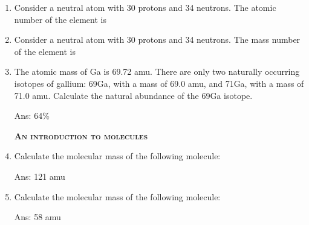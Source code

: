 \documentclass[main.tex]{subfiles}
\begin{document}
\begin{multicols*}{2}
\begin{enumerate}
\item Consider a neutral atom with 30 protons and 34 neutrons. The atomic number of the element is
\begin{enumerate}[label=(\alph*)]
\end{enumerate}

\item Consider a neutral atom with 30 protons and 34 neutrons. The mass number of the element is
\begin{enumerate}[label=(\alph*)]
\end{enumerate}

\item The atomic mass of Ga is 69.72 amu. There are only two naturally occurring isotopes of gallium: 69Ga, with a mass of 69.0 amu, and 71Ga, with a mass of 71.0 amu. Calculate the natural abundance of the 69Ga isotope. 
\begin{flushright}\small Ans: 64\% \end{flushright}



{\raggedright\textsc{\textbf{An introduction to molecules }}\par}

\item Calculate the molecular mass of the following molecule: 
\begin{flushright}\small Ans: 121 amu \end{flushright}

\item Calculate the molecular mass of the following molecule: 
\begin{flushright}\small Ans: 58 amu \end{flushright}


\end{enumerate}
\end{multicols*}
\end{document}
